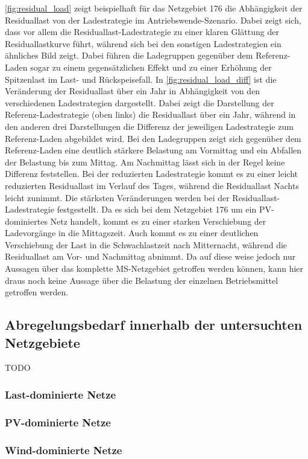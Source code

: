 \autoref{fig:residual_load} zeigt beispielhaft für das Netzgebiet \num{176} die Abhängigkeit der Residuallast von der Ladestrategie im Antriebswende-Szenario.
Dabei zeigt sich, dass vor allem die Residuallast-Ladestrategie zu einer klaren Glättung der Residuallastkurve führt, während sich bei den sonstigen Ladestrategien ein ähnliches Bild zeigt.
Dabei führen die Ladegruppen gegenüber dem Referenz-Laden sogar zu einem gegensätzlichen Effekt und zu einer Erhöhung der Spitzenlast im Last- und Rückspeisefall.
In \autoref{fig:residual_load_diff} ist die Veränderung der Residuallast über ein Jahr in Abhängigkeit von den verschiedenen Ladestrategien dargestellt.
Dabei zeigt die Darstellung der Referenz-Ladestrategie (oben links) die Residuallast über ein Jahr, während in den anderen drei Darstellungen die Differenz der jeweiligen Ladestrategie zum Referenz-Laden abgebildet wird.
Bei den Ladegruppen zeigt sich gegenüber dem Referenz-Laden eine deutlich stärkere Belastung am Vormittag und ein Abfallen der Belastung bis zum Mittag.
Am Nachmittag lässt sich in der Regel keine Differenz feststellen.
Bei der reduzierten Ladestrategie kommt es zu einer leicht reduzierten Residuallast im Verlauf des Tages, während die Residuallast Nachts leicht zunimmt.
Die stärksten Veränderungen werden bei der Residuallast-Ladestrategie festgestellt.
Da es sich bei dem Netzgebiet \num{176} um ein \gls{PV}-dominiertes Netz handelt, kommt es zu einer starken Verschiebung der Ladevorgänge in die Mittagszeit.
Auch kommt es zu einer deutlichen Verschiebung der Last in die Schwachlastzeit nach Mitternacht, während die Residuallast am Vor- und Nachmittag abnimmt.
Da auf diese weise jedoch nur Aussagen über das komplette \gls{MS}-Netzgebiet getroffen werden können, kann hier draus noch keine Aussage über die Belastung der einzelnen Betriebsmittel getroffen werden.





\subsection{Abregelungsbedarf innerhalb der untersuchten Netzgebiete}

{\color{red} TODO}


\subsubsection{Last-dominierte Netze}




\subsubsection{PV-dominierte Netze}




\subsubsection{Wind-dominierte Netze}




\clearpage
